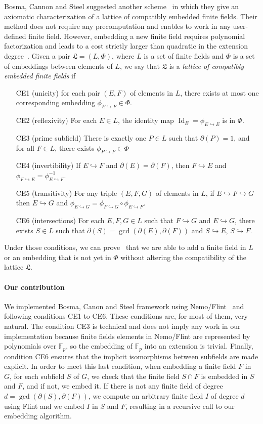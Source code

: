 \documentclass[12pt]{article}
\DeclareMathOperator{\Id}{Id}
\newcommand{\dE}{\partial(E)}
\newcommand{\dF}{\partial(F)}
\newcommand{\emb}{\hookrightarrow}
\newcommand{\embed}[2]{\phi_{#1\hookrightarrow#2}}
\begin{document}
Bosma, Cannon and Steel suggested another scheme~\cite{BCS97} in which they
give an axiomatic characterization of a lattice of compatibly embedded finite
fields. Their method does not require any precomputation and enables to work in
any user-defined finite field. However, embedding a new finite field requires
polynomial factorization and leads to a cost strictly larger than quadratic in
the extension degree~\cite{BDDFS17}.
Given a pair $\mathfrak L=(L, \Phi)$, where
$L$ is a set of finite fields and $\Phi$ is a set of embeddings between
elements of $L$, we say that $\mathfrak L$ is a \emph{lattice of compatibly
embedded finite fields} if
\begin{enumerate}
  \item[CE1] (unicity) for each pair $(E, F)$ of elements in $L$, there exists
    at most one corresponding embedding $\embed{E}{F}\in\Phi$.
  \item[CE2] (reflexivity) For each $E\in L$, the identity map
    $\Id_E=\embed{E}{E}$ is in $\Phi$.
  \item[CE3] (prime subfield) There is exactly one $P\in L$ such that $\partial
    (P) = 1$, and for all $F\in L$, there exists $\embed{P}{F}\in\Phi$
  \item[CE4] (invertibility) If $E\emb F$ and $\dE=\dF$, then $F\emb E$ and
    $\embed{F}{E}=\embed{E}{F}^{-1}$.
  \item[CE5] (transitivity) For any triple $(E, F, G)$ of elements in $L$, if $E\emb
    F\emb G$ then $E\emb G$ and
    $\embed{E}{G}=\embed{F}{G}\circ\embed{E}{F}$.
  \item[CE6](intersections) For each $E, F, G\in L$ such that $F\emb G$ and
    $E\emb G$, there exists $S\in L$ such that $\partial(S)=\gcd(\dE, \dF)$
    and $S\emb E$, $S\emb F$.
\end{enumerate}

Under those conditions, we can prove~\cite{BCS97} that we are able to add a
finite field in
$L$ or an embedding that is not yet in $\Phi$ without altering the compatibility
of the lattice $\mathfrak L$.

\paragraph{Our contribution}

We implemented Bosma, Canon and Steel framework using Nemo/Flint~\cite{Nemo,
Flint} and following conditions CE1 to CE6. These
conditions are, for most of them, very natural. The condition CE3 is
technical and does not imply any work in our implementation because
finite fields elements in Nemo/Flint are represented by
polynomials over $\mathbb{F}_p$, so the embedding of $\mathbb{F}_p$ into an
extension is trivial. Finally, condition
CE6 ensures that the implicit isomorphisms between subfields are made
explicit. In order to meet this last condition, when embedding a finite field
$F$ in $G$, for each subfield $S$ of $G$, we check that the finite field $S\cap F$ is 
embedded in $S$ and $F$, and if not, we embed it. If there is not
any finite field of degree $d=\gcd(\partial(S), \dF)$, we compute an
arbitrary finite field $I$ of degree $d$ using Flint
and we embed $I$ in $S$ and $F$, resulting in a recursive call to our
embedding algorithm. 
\end{document}
